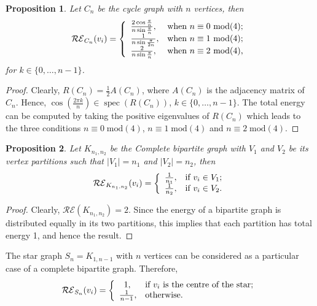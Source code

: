 \documentclass[10 pt]{article}
\newtheorem{proposition}{Proposition}[section]
\numberwithin{equation}{section}
\newcommand{\spec}{\operatorname{spec}}
\begin{document}
\begin{proposition}
Let $C_n$ be the cycle graph with $n$ vertices, then
$$
\mathcal{RE}_{C_n}(v_i)=\left\{
  \begin{array}{ll}
    \frac{2\cos{\frac{\pi}{n}}}{n\sin{\frac{\pi}{n}}}, & \hbox{when $n\equiv 0$ mod(4);} \\
    \frac{1}{n\sin{\frac{\pi}{2n}}}, & \hbox{when $n\equiv 1$ mod(4);}\\
    \frac{2}{n\sin{\frac{\pi}{n}}}, & \hbox{when $n\equiv 2$ mod(4),}
  \end{array}
\right.
$$
for $k\in \{0,\ldots,n-1\}$.\\
\end{proposition}
\begin{proof}
Clearly, $R(C_n)=\frac{1}{2}A(C_n)$, where $A(C_n)$ is the adjacency matrix of $C_n$. Hence, $\cos\left({\frac{2\pi k}{n}}\right)\in\spec(R(C_n))$, $k\in \{0,\ldots,n-1\}$. The total energy can be computed by taking the positive eigenvalues of $R(C_n)$ which leads to the three conditions $n\equiv 0 \; \text{mod}(4)$, $n\equiv 1 \; \text{mod}(4)$ and $n\equiv 2\; \text{mod}(4)$.
\end{proof}

\begin{proposition}
Let $K_{n_1,n_2}$ be the Complete bipartite graph with $V_1$ and $V_2$ be its vertex partitions such that $|V_1|=n_1$ and $|V_2|=n_2$, then
$$\mathcal{RE}_{K_{n_1,n_2}}(v_i)=\left\{
    \begin{array}{ll}
      \frac{1}{n_1}, & \hbox{if $v_i \in V_1$;} \\
      \frac{1}{n_2}, & \hbox{if $v_i \in V_2$.}
    \end{array}
  \right.
$$
\end{proposition}
\begin{proof}
Clearly, $\mathcal{RE}(K_{n_1,n_2})=2$. Since the energy of a bipartite graph is distributed equally in its two partitions, this implies that each partition has total energy 1, and hence the result.
\end{proof}

The star graph $S_n=K_{1,n-1}$ with $n$ vertices can be considered as a particular case of a complete bipartite graph. Therefore,
$$\mathcal{RE}_{S_n}(v_i)=\left\{
    \begin{array}{ll}
      \;\;1, & \hbox{if $v_i$ is the centre of the star;} \\
      \frac{1}{n-1}, & \hbox{otherwise.}
    \end{array}
  \right.
$$
\end{document}
